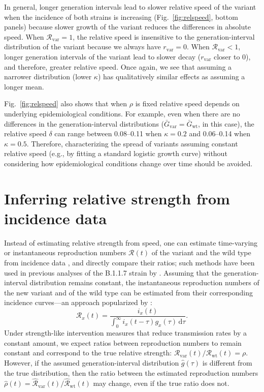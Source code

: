 \documentclass[12pt]{article}
\newcommand{\fref}[1]{Fig.~\ref{fig:#1}}
\newcommand{\vvvar}{\mathrm{var}}
\newcommand{\wwwt}{\mathrm{wt}}
\newcommand{\rx}[1]{\ensuremath{{r}_{#1}}\xspace}
\newcommand{\rv}{\rx{\vvvar}}
\newcommand{\Rx}[1]{\ensuremath{{\mathcal R}_{#1}}\xspace}
\newcommand{\RR}{\ensuremath{{\mathcal R}}\xspace}
\newcommand{\Rw}{\Rx{\wwwt}}
\newcommand{\Rv}{\Rx{\vvvar}}
\newcommand{\dd}[1]{\ensuremath{\, \mathrm{d}#1}}
\newcommand{\dtau}{\dd{\tau}}
\newcommand{\Gx}[1]{\ensuremath{{\bar G}_{#1}}\xspace}
\newcommand{\Gw}{\Gx{\wwwt}}
\newcommand{\Gv}{\Gx{\vvvar}}
\begin{document}
In general, longer generation intervals lead to slower relative speed of the variant when the incidence of both strains is increasing (\fref{relspeed}, bottom panels) because slower growth of the variant reduces the differences in absolute speed.
When $\Rv=1$, the relative speed is insensitive to the generation-interval distribution of the variant because we always have $\rv=0$.
When $\Rv<1$, longer generation intervals of the variant lead to slower decay ($\rv$ closer to 0), and therefore, greater relative speed.
Once again, we see that assuming a narrower distribution (lower $\kappa$) has qualitatively similar effects as assuming a longer mean.

\fref{relspeed} also shows that when $\rho$ is fixed relative speed depends on underlying epidemiological conditions. 
For example, even when there are no differences in the generation-interval distributions ($\Gv=\Gw$, in this case), the relative speed $\delta$ can range between 0.08--0.11 when $\kappa=0.2$ and 0.06--0.14 when $\kappa=0.5$.
Therefore, characterizing the spread of variants assuming constant relative speed (e.g., by fitting a standard logistic growth curve) without considering how epidemiological conditions change over time should be avoided.

\section{Inferring relative strength from incidence data}

Instead of estimating relative strength from speed, one can estimate time-varying or instantaneous reproduction numbers $\RR(t)$ of the variant and the wild type from incidence data \citep{fraser2007estimating}, and directly compare their ratios;
such methods have been used in previous analyses of the B.1.1.7 strain by \cite{volz2021transmission}.
Assuming that the generation-interval distribution remains constant, the instantaneous reproduction numbers of the new variant and of the wild type can be estimated from their corresponding incidence curves---an approach popularized by \cite{cori2013new}:
\begin{equation}
\RR_x(t) = \frac{i_x(t)}{\int_0^\infty i_x(t-\tau) g_x(\tau) \dtau}.
\label{eq:rt}
\end{equation}
Under strength-like intervention measures that reduce transmission rates by a constant amount, we expect ratios between reproduction numbers to remain constant and correspond to the true relative strength: $\Rv(t)/\Rw(t) = \rho$.
However, if the assumed generation-interval distribution $\hat{g}(\tau)$ is different from the true distribution, then the ratio between the estimated reproduction numbers $\hat{\rho}(t) = \hat{\RR}_{\textrm{var}}(t)/\hat{\RR}_{\textrm{wt}}(t)$ may change, even if the true ratio does not.
\end{document}
